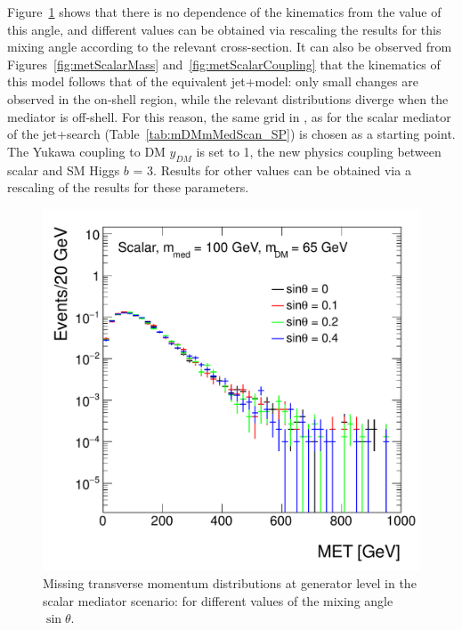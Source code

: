 Figure~\ref{fig:metScalarCoupling2} shows that
there is no dependence of the kinematics from the value of this angle, and different values can be obtained via rescaling
the results for this mixing angle according to the relevant cross-section. It can also be observed from Figures~\ref{fig:metScalarMass} and~\ref{fig:metScalarCoupling} 
that the kinematics of this model follows that of the equivalent jet+\MET model: only small changes are observed
in the on-shell region, while the relevant distributions diverge when the mediator is off-shell. 
For this reason, the same grid in \mmed, \mdm as for the scalar mediator
of the jet+\MET search (Table~\ref{tab:mDMmMedScan_SP}) is chosen as a starting point. 
The Yukawa coupling to DM $y_{DM}$ is set to 1, the 
new physics coupling between scalar and SM Higgs $b$ = 3. Results for other values can be obtained via a 
rescaling of the results for these parameters. 



\begin{figure}[hbpt!]
	\begin{center}
		\includegraphics[width=0.75\linewidth]{figures/EW/monoH/s_theta_65_100_2_MET_et_Log}
		\caption{Missing transverse momentum distributions at generator level in the scalar 
			mediator scenario: for different values of the mixing angle $\sin\theta$.
			\label{fig:metScalarCoupling2} }
	\end{center}
\end{figure}


